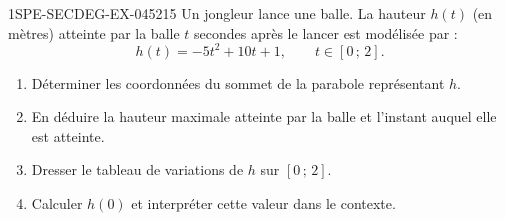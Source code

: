 \begin{exercice}{1SPE-SECDEG-EX-045}{2}{15}
Un jongleur lance une balle. La hauteur $h(t)$ (en mètres) atteinte par la balle $t$ secondes après le lancer est modélisée par :
\[
h(t) = -5t^2 + 10t + 1, \qquad t \in [0\,;\,2].
\]

\begin{enumerate}
  \item Déterminer les coordonnées du sommet de la parabole représentant $h$.
  \item En déduire la hauteur maximale atteinte par la balle et l'instant auquel elle est atteinte.
  \item Dresser le tableau de variations de $h$ sur $[0\,;\,2]$.
  \item Calculer $h(0)$ et interpréter cette valeur dans le contexte.
\end{enumerate}
\end{exercice}
